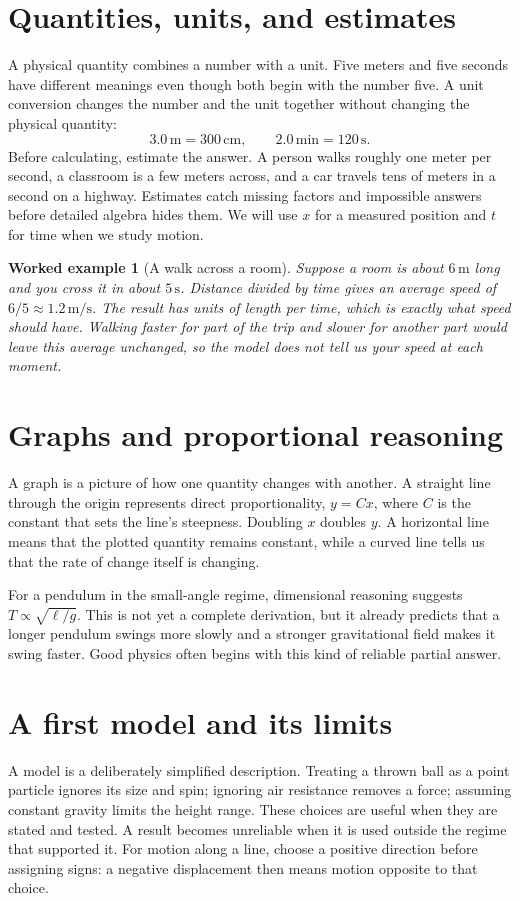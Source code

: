 \documentclass[11pt,oneside]{book}
\theoremstyle{reviewstyle}
\newtheorem{example}{Worked example}[chapter]
\begin{document}
\section{Quantities, units, and estimates}
A physical quantity combines a number with a unit. Five meters and five seconds have different meanings even though both begin with the number five. A unit conversion changes the number and the unit together without changing the physical quantity:
\begin{equation}
3.0\,\mathrm{m}=300\,\mathrm{cm},\qquad 2.0\,\mathrm{min}=120\,\mathrm{s}.
\end{equation}
Before calculating, estimate the answer. A person walks roughly one meter per second, a classroom is a few meters across, and a car travels tens of meters in a second on a highway. Estimates catch missing factors and impossible answers before detailed algebra hides them. We will use $x$ for a measured position and $t$ for time when we study motion.

\begin{example}[A walk across a room]
Suppose a room is about $6\,\mathrm m$ long and you cross it in about $5\,\mathrm s$. Distance divided by time gives an average speed of $6/5\approx1.2\,\mathrm{m/s}$. The result has units of length per time, which is exactly what speed should have. Walking faster for part of the trip and slower for another part would leave this average unchanged, so the model does not tell us your speed at each moment.
\end{example}

\section{Graphs and proportional reasoning}
A graph is a picture of how one quantity changes with another. A straight line through the origin represents direct proportionality, $y=Cx$, where $C$ is the constant that sets the line's steepness. Doubling $x$ doubles $y$. A horizontal line means that the plotted quantity remains constant, while a curved line tells us that the rate of change itself is changing.

For a pendulum in the small-angle regime, dimensional reasoning suggests $T\propto\sqrt{\ell/g}$. This is not yet a complete derivation, but it already predicts that a longer pendulum swings more slowly and a stronger gravitational field makes it swing faster. Good physics often begins with this kind of reliable partial answer.

\section{A first model and its limits}
A model is a deliberately simplified description. Treating a thrown ball as a point particle ignores its size and spin; ignoring air resistance removes a force; assuming constant gravity limits the height range. These choices are useful when they are stated and tested. A result becomes unreliable when it is used outside the regime that supported it. For motion along a line, choose a positive direction before assigning signs: a negative displacement then means motion opposite to that choice.
\end{document}
